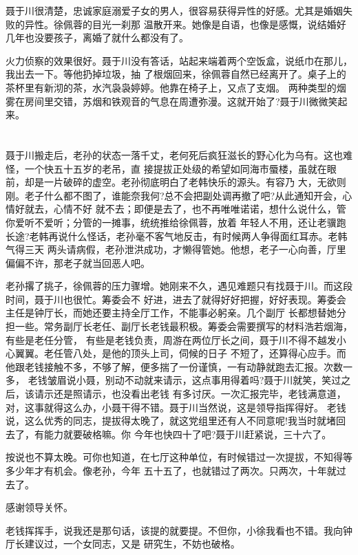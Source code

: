 \documentclass[11pt,a4paper,onecolumn]{article}
\begin{document}
聂于川很清楚，忠诚家庭溺爱子女的男人，很容易获得异性的好感。尤其是婚姻失败的异性。徐佩蓉的目光一刹那
温散开来。她像是自语，也像是感慨，说结婚好几年也没要孩子，离婚了就什么都没有了。

火力侦察的效果很好。聂于川没有答话，站起来端着两个空饭盒，说纸巾在那儿，我出去一下。等他扔掉垃圾，抽
了根烟回来，徐佩蓉自然已经离开了。桌子上的茶杯里有新沏的茶，水汽袅袅婷婷。他靠在椅子上，又点了支烟。
两种类型的烟雾在房间里交错，苏烟和铁观音的气息在周遭弥漫。这就开始了?聂于川微微笑起来。

\section[\thesection]{}

聂于川搬走后，老孙的状态一落千丈，老何死后疯狂滋长的野心化为乌有。这也难怪，一个快五十五岁的老吊，直
接提拔正处级的希望如同海市蜃楼，虽就在眼前，却是一片破碎的虚空。老孙彻底明白了老韩快乐的源头。有容乃
大，无欲则刚。老子什么都不图了，谁能奈我何?总不会把副处调再撤了吧?从此通知开会，心情好就去，心情不好
就不去；即便是去了，也不再唯唯诺诺，想什么说什么，管你爱听不爱听；分管的一摊事，统统推给徐佩蓉，放着
年轻人不用，还让老骥跑长途?老韩再说什么怪话，老孙毫不客气地反击，有时候两人争得面红耳赤。老韩气得三天
两头请病假，老孙泄洪成功，才懒得管她。他想，老子一心向善，厅里偏偏不许，那老子就当回恶人吧。

老孙撂了挑子，徐佩蓉的压力骤增。她刚来不久，遇见难题只有找聂于川。而这段时间，聂于川也很忙。筹委会不
好进，进去了就得好好把握，好好表现。筹委会主任是钟厅长，而她还要主持全厅工作，不能事必躬亲。几个副厅
长都想替她分担一些。常务副厅长老任、副厅长老钱最积极。筹委会需要撰写的材料浩若烟海，有些是老任分管，
有些是老钱负责，周游在两位厅长之间，聂于川不得不越发小心翼翼。老任管八处，是他的顶头上司，伺候的日子
不短了，还算得心应手。而他跟老钱接触不多，不够了解，便多揣了一份谨慎，一有动静就跑去汇报。次数一多，
老钱皱眉说小聂，别动不动就来请示，这点事用得着吗?聂于川就笑，笑过之后，该请示还是照请示，也没看出老钱
有多讨厌。一次汇报完毕，老钱满意道，对，这事就得这么办，小聂干得不错。聂于川当然说，这是领导指挥得好。
老钱说，这么优秀的同志，提拔得太晚了，就这党组里还有人不同意呢!我当时就堵回去了，有能力就要破格嘛。你
今年也快四十了吧?聂于川赶紧说，三十六了。

按说也不算太晚。可你也知道，在七厅这种单位，有时候错过一次提拔，不知得等多少年才有机会。像老孙，今年
五十五了，也就错过了两次。只两次，十年就过去了。

感谢领导关怀。

老钱挥挥手，说我还是那句话，该提的就要提。不但你，小徐我看也不错。我向钟厅长建议过，一个女同志，又是
研究生，不妨也破格。
\end{document}
